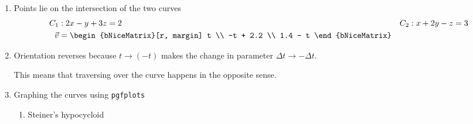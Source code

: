 \begin{enumerate}
    \item Points lie on the intersection of the two curves
          \begin{align}
              C_1     & : 2x - y + 3z = 2                &
              C_2     & : x + 2y - z = 3                   \\
              \vec{v} & = \begin{bNiceMatrix}[r, margin]
                              t \\ -t + 2.2 \\ 1.4 - t
                          \end{bNiceMatrix}
          \end{align}

    \item Orientation reverses because $ t \to (-t) $ makes the change in
          parameter $ \Delta t \to -\Delta t $. \par
          This means that traversing over the curve happens in the opposite sense.

    \item Graphing the curves using \texttt{pgfplots}
          \begin{enumerate}
              \item Steiner's hypocycloid
                    \begin{figure}[H]
                        \centering
                    \end{figure}


\end{enumerate}
\end{enumerate}
